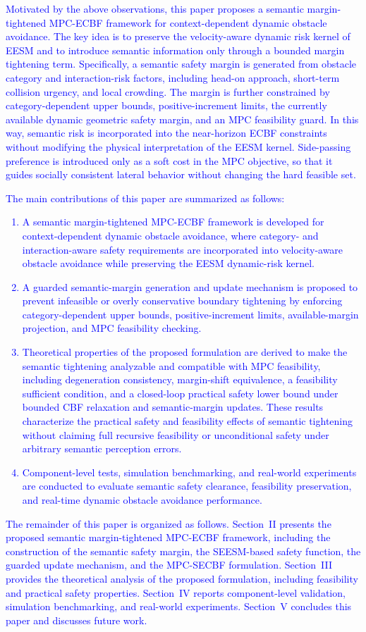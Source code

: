 \documentclass[journal]{IEEEtranTIE}
\begin{document}
\textcolor{blue}{Motivated by the above observations, this paper proposes a semantic margin-tightened MPC-ECBF framework for context-dependent dynamic obstacle avoidance. The key idea is to preserve the velocity-aware dynamic risk kernel of EESM and to introduce semantic information only through a bounded margin tightening term. Specifically, a semantic safety margin is generated from obstacle category and interaction-risk factors, including head-on approach, short-term collision urgency, and local crowding. The margin is further constrained by category-dependent upper bounds, positive-increment limits, the currently available dynamic geometric safety margin, and an MPC feasibility guard. In this way, semantic risk is incorporated into the near-horizon ECBF constraints without modifying the physical interpretation of the EESM kernel. Side-passing preference is introduced only as a soft cost in the MPC objective, so that it guides socially consistent lateral behavior without changing the hard feasible set.}

\textcolor{blue}{The main contributions of this paper are summarized as follows:
\begin{enumerate}
    \item A semantic margin-tightened MPC-ECBF framework is developed for context-dependent dynamic obstacle avoidance, where category- and interaction-aware safety requirements are incorporated into velocity-aware obstacle avoidance while preserving the EESM dynamic-risk kernel.
    \item A guarded semantic-margin generation and update mechanism is proposed to prevent infeasible or overly conservative boundary tightening by enforcing category-dependent upper bounds, positive-increment limits, available-margin projection, and MPC feasibility checking.
    \item Theoretical properties of the proposed formulation are derived to make the semantic tightening analyzable and compatible with MPC feasibility, including degeneration consistency, margin-shift equivalence, a feasibility sufficient condition, and a closed-loop practical safety lower bound under bounded CBF relaxation and semantic-margin updates. These results characterize the practical safety and feasibility effects of semantic tightening without claiming full recursive feasibility or unconditional safety under arbitrary semantic perception errors.
    \item Component-level tests, simulation benchmarking, and real-world experiments are conducted to evaluate semantic safety clearance, feasibility preservation, and real-time dynamic obstacle avoidance performance.
\end{enumerate}
The remainder of this paper is organized as follows. Section~II presents the proposed semantic margin-tightened MPC-ECBF framework, including the construction of the semantic safety margin, the SEESM-based safety function, the guarded update mechanism, and the MPC-SECBF formulation. Section~III provides the theoretical analysis of the proposed formulation, including feasibility and practical safety properties. Section~IV reports component-level validation, simulation benchmarking, and real-world experiments. Section~V concludes this paper and discusses future work.}
\end{document}
